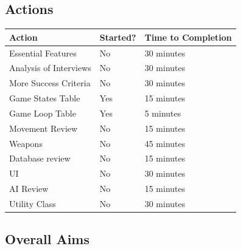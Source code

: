 \clearpage
\subsection{Actions}

\begin{center}
\begin{longtable}{|p{7cm}|p{2.5cm}|p{4cm}|}
    \hline
    Action & Started? & Time to Completion\\
    \hline
    \hline
    Essential Features & No & 30 minutes\\
    \hline
    Analysis of Interviews & No & 30 minutes\\
    \hline
    More Success Criteria & No & 30 minutes\\
    \hline
    Game States Table & Yes & 15 minutes\\
    \hline
    Game Loop Table & Yes & 5 minutes\\
    \hline
    Movement Review & No & 15 minutes\\
    \hline
    Weapons & No & 45 minutes\\
    \hline
    Database review & No & 15 minutes\\
    \hline
    UI & No & 30 minutes\\
    \hline
    AI Review & No & 15 minutes\\
    \hline
    Utility Class & No & 30 minutes\\
    \hline
\end{longtable}
\end{center}

\clearpage
\subsection{Overall Aims}

